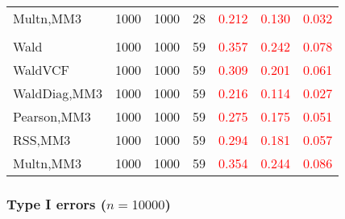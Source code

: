 \documentclass[
]{article}
\begin{document}
\begin{table}[H]
{\begin{tabular}[t]{lrrrrrr}
\hspace{1em}Multn,MM3 & 1000 & 1000 & 28 & \textcolor{red}{0.212} & \textcolor{red}{0.130} & \textcolor{red}{0.032}\\
\addlinespace[0.3em]
\multicolumn{7}{l}{\textbf{3F 15V}}\\
\hspace{1em}Wald & 1000 & 1000 & 59 & \textcolor{red}{0.357} & \textcolor{red}{0.242} & \textcolor{red}{0.078}\\
\hspace{1em}WaldVCF & 1000 & 1000 & 59 & \textcolor{red}{0.309} & \textcolor{red}{0.201} & \textcolor{red}{0.061}\\
\hspace{1em}WaldDiag,MM3 & 1000 & 1000 & 59 & \textcolor{red}{0.216} & \textcolor{red}{0.114} & \textcolor{red}{0.027}\\
\hspace{1em}Pearson,MM3 & 1000 & 1000 & 59 & \textcolor{red}{0.275} & \textcolor{red}{0.175} & \textcolor{red}{0.051}\\
\hspace{1em}RSS,MM3 & 1000 & 1000 & 59 & \textcolor{red}{0.294} & \textcolor{red}{0.181} & \textcolor{red}{0.057}\\
\hspace{1em}Multn,MM3 & 1000 & 1000 & 59 & \textcolor{red}{0.354} & \textcolor{red}{0.244} & \textcolor{red}{0.086}\\
\bottomrule
\end{tabular}}
\endgroup{}
\end{table}

\hypertarget{type-i-errors-n10000-1}{%
\subsubsection{\texorpdfstring{Type I errors
(\(n=10000\))}{Type I errors (n=10000)}}\label{type-i-errors-n10000-1}}
\end{document}
